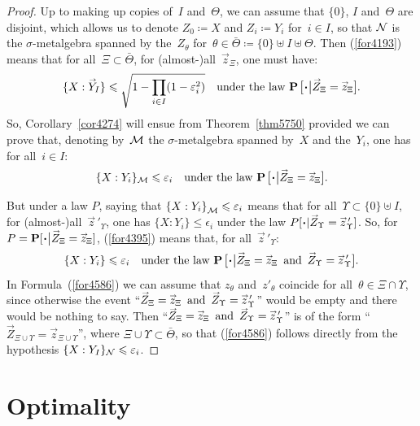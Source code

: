 \begin{proof}
Up to making up copies of~$I$ and~$\Theta$,
we can assume that $\{0\}$, $I$ and~$\Theta$ are disjoint,
which allows us to denote $Z_0 \coloneqq X$ and $Z_i \coloneqq Y_i$ for~$i\in I$,
so that $\mathcal{N}$ is the $\sigma$-metalgebra spanned by the~$Z_\theta$
for~$\theta\in\bar{\Theta} \coloneqq \{0\} \uplus I \uplus \Theta$.
%
Then (\ref{for4193}) means that for all~$\Xi \subset \bar{\Theta}$,
for (almost-)all~$\vec{z}_{\Xi}$, one must have:
\[ \{ X : \vec{Y}_I \} \leq \sqrt{1-\prod_{i\in I}(1-\epsilon_i^2)} 
\quad \text{under the law $\Pr\big[\Bcdot\big|\vec{Z}_{\Xi} = \vec{z}_{\Xi}\big]$.} \]
%
So, Corollary~\ref{cor4274} will ensue from Theorem~\ref{thm5750}
provided we can prove that, denoting by~$\mathcal{M}$ the $\sigma$-metalgebra spanned by~$X$ and the~$Y_i$,
one has for all~$i\in I$:
\[\label{for4395} \{ X : Y_i \}_{\mcal{M}} \leq \epsilon_i
\quad \text{under the law $\Pr\big[\Bcdot\big|\vec{Z}_{\Xi} = \vec{z}_{\Xi}\big]$.} \]

But under a law $P$, saying that ${\{X:Y_i\}}_{\mathcal{M}} \leqslant \varepsilon_i$ means that for all~$\Upsilon\subset\{0\}\uplus I$,
for (almost-)all~$\vec{z}\,'_{\!\Upsilon}$,
one has ${\{X:Y_i\}}\leq\epsilon_i$ under the law $P[\Bcdot|\vec{Z}_{\Upsilon} = \vec{z}\,'_{\!\Upsilon}]$.
So, for $P = \Pr[\Bcdot\big|\vec{Z}_{\Xi} = \vec{z}_{\Xi}]$,
(\ref{for4395}) means that, for all~$\vec{z}\,'_{\!\Upsilon}$:
%
\[\label{for4586} \{ X : Y_i \} \leq \epsilon_i
\quad \text{under the law $\Pr\big[\Bcdot\big|\vec{Z}_{\Xi} = \vec{z}_{\Xi}\enskip\text{and}\enskip \vec{Z}_{\Upsilon} = \vec{z}\,'_{\!\Upsilon}\big]$.} \]
In Formula~(\ref{for4586}) we can assume that $z_\theta$ and~$z'_\theta$ coincide
for all~$\theta \in \Xi \cap \Upsilon$,
since otherwise the event ``$\vec{Z}_{\Xi}=\vec{z}_{\Xi}\enskip\text{and}\enskip \vec{Z}_{\Upsilon} = \vec{z}\,'_{\!\Upsilon}$''
would be empty and there would be nothing to say.
Then ``$\vec{Z}_{\Xi}=\vec{z}_{\Xi}\enskip\text{and}\enskip \vec{Z}_{\Upsilon} = \vec{z}\,'_{\!\Upsilon}$''
is of the form ``$\vec{Z}_{\Xi\cup\Upsilon} = \vec{z}_{\Xi\cup\Upsilon}$'',
where $\Xi\cup\Upsilon \subset \bar{\Theta}$,
so that (\ref{for4586}) follows directly from the hypothesis
$\{X:Y_I\}_{\mathcal{N}} \leqslant \varepsilon_i$.
\end{proof}




\section{Optimality}\label{parOptimality}

